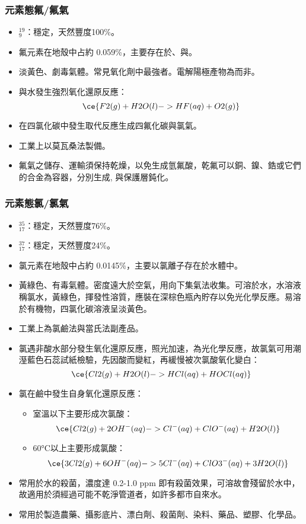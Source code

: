 \documentclass[a4paper,12pt]{report}
\begin{document}
\subsubsection{元素態氟/氟氣}
\begin{itemize}
\item $^{19}_9$\rmF：穩定，天然豐度100\%。
\item 氟元素在地殼中占約 0.059\%，主要存在於、與。
\item 淡黃色、劇毒氣體。常見氧化劑中最強者。電解陽極產物為而非。
\item 與水發生強烈氧化還原反應：
\[\ce{F2(g) + H2O(l) -> HF(aq) + O2(g)}\]
\item 在四氯化碳中發生取代反應生成四氟化碳與氯氣。
\item 工業上以莫瓦桑法製備。
\item 氟氣之儲存、運輸須保持乾燥，以免生成氫氟酸，乾氟可以銅、鎳、鋯或它們的合金為容器，分別生成, 與保護層鈍化。
\end{itemize}
\subsubsection{元素態氯/氯氣}
\begin{itemize}
\item $^{35}_{17}$\rmCl：穩定，天然豐度76\%。
\item $^{37}_{17}$\rmCl：穩定，天然豐度24\%。
\item 氯元素在地殼中占約 0.0145\%，主要以氯離子存在於水體中。
\item 黃綠色、有毒氣體。密度遠大於空氣，用向下集氣法收集。可溶於水，水溶液稱氯水，黃綠色，揮發性溶質，應裝在深棕色瓶內貯存以免光化學反應。易溶於有機物，四氯化碳溶液呈淡黃色。
\item 工業上為氯鹼法與當氏法副產品。
\item 氯遇非酸水部分發生氧化還原反應，照光加速，為光化學反應，故氯氣可用潮溼藍色石蕊試紙檢驗，先因酸而變紅，再緩慢被次氯酸氧化變白：
\[\ce{Cl2(g) + H2O(l) -> HCl(aq) + HOCl(aq)}\]
\item 氯在鹼中發生自身氧化還原反應：
\begin{itemize}
\item 室溫以下主要形成次氯酸：
\[\ce{Cl2(g) + 2OH^-(aq) -> Cl^-(aq) + ClO^-(aq) + H2O(l)}\]
\item 60°C以上主要形成氯酸：
\[\ce{3Cl2(g) + 6OH^-(aq) -> 5Cl^-(aq) + ClO3^-(aq) + 3H2O(l)}\]
\end{itemize}
\item 常用於水的殺菌，濃度達 0.2-1.0 ppm 即有殺菌效果，可溶故會殘留於水中，故適用於須經過可能不乾淨管道者，如許多都市自來水。
\item 常用於製造農藥、攝影底片、漂白劑、殺菌劑、染料、藥品、塑膠、化學品。
\end{itemize}
\end{document}
